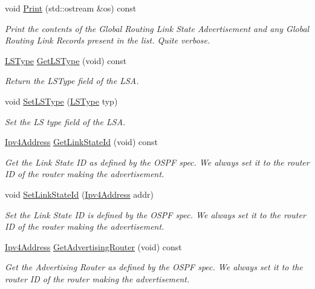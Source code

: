 \begin{DoxyCompactItemize}
void \hyperlink{classns3_1_1GlobalRoutingLSA_aa1a7c56033c20a1f208db459d042ff9e}{Print} (std\+::ostream \&os) const 
\begin{DoxyCompactList}\small\item\em Print the contents of the Global Routing Link State Advertisement and any Global Routing Link Records present in the list. Quite verbose. \end{DoxyCompactList}\item 
\hyperlink{classns3_1_1GlobalRoutingLSA_a34eb53a1ed37c877923b74d671224fde}{L\+S\+Type} \hyperlink{classns3_1_1GlobalRoutingLSA_aa3cd2efb67cfacfdc509b3ab86e73af5}{Get\+L\+S\+Type} (void) const 
\begin{DoxyCompactList}\small\item\em Return the L\+S\+Type field of the L\+SA. \end{DoxyCompactList}\item 
void \hyperlink{classns3_1_1GlobalRoutingLSA_a8f68a559296813ae47d5cabc5f566ddb}{Set\+L\+S\+Type} (\hyperlink{classns3_1_1GlobalRoutingLSA_a34eb53a1ed37c877923b74d671224fde}{L\+S\+Type} typ)
\begin{DoxyCompactList}\small\item\em Set the LS type field of the L\+SA. \end{DoxyCompactList}\item 
\hyperlink{classns3_1_1Ipv4Address}{Ipv4\+Address} \hyperlink{classns3_1_1GlobalRoutingLSA_afc7dd85af408f8b9236bd73e1a78f5bd}{Get\+Link\+State\+Id} (void) const 
\begin{DoxyCompactList}\small\item\em Get the Link State ID as defined by the O\+S\+PF spec. We always set it to the router ID of the router making the advertisement. \end{DoxyCompactList}\item 
void \hyperlink{classns3_1_1GlobalRoutingLSA_af31bd5b6ff2fe784f3df4e5b921b4081}{Set\+Link\+State\+Id} (\hyperlink{classns3_1_1Ipv4Address}{Ipv4\+Address} addr)
\begin{DoxyCompactList}\small\item\em Set the Link State ID is defined by the O\+S\+PF spec. We always set it to the router ID of the router making the advertisement. \end{DoxyCompactList}\item 
\hyperlink{classns3_1_1Ipv4Address}{Ipv4\+Address} \hyperlink{classns3_1_1GlobalRoutingLSA_a60cf4a3118469f09f79532a795741d07}{Get\+Advertising\+Router} (void) const 
\begin{DoxyCompactList}\small\item\em Get the Advertising Router as defined by the O\+S\+PF spec. We always set it to the router ID of the router making the advertisement. \end{DoxyCompactList}\item 

\end{DoxyCompactItemize}
